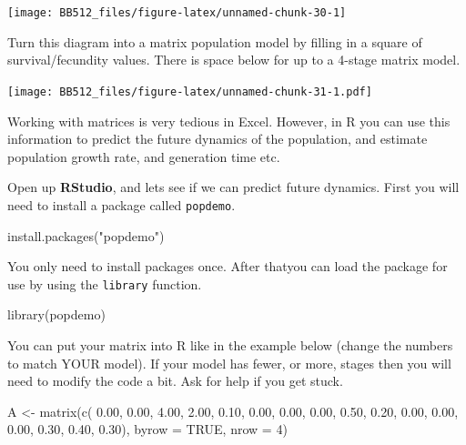 \documentclass[
  a4paper]{book}
\newenvironment{Shaded}{\begin{snugshade}}{\end{snugshade}}
\newcommand{\AttributeTok}[1]{\textcolor[rgb]{0.77,0.63,0.00}{#1}}
\newcommand{\ConstantTok}[1]{\textcolor[rgb]{0.00,0.00,0.00}{#1}}
\newcommand{\DecValTok}[1]{\textcolor[rgb]{0.00,0.00,0.81}{#1}}
\newcommand{\FloatTok}[1]{\textcolor[rgb]{0.00,0.00,0.81}{#1}}
\newcommand{\FunctionTok}[1]{\textcolor[rgb]{0.00,0.00,0.00}{#1}}
\newcommand{\NormalTok}[1]{#1}
\newcommand{\OtherTok}[1]{\textcolor[rgb]{0.56,0.35,0.01}{#1}}
\newcommand{\StringTok}[1]{\textcolor[rgb]{0.31,0.60,0.02}{#1}}
\begin{document}
\texttt{[image: BB512\_files/figure-latex/unnamed-chunk-30-1]}

Turn this diagram into a matrix population model by filling in a square
of survival/fecundity values. There is space below for up to a 4-stage
matrix model.

\texttt{[image: BB512\_files/figure-latex/unnamed-chunk-31-1.pdf]}

Working with matrices is very tedious in Excel. However, in R you can
use this information to predict the future dynamics of the population,
and estimate population growth rate, and generation time etc.

Open up \textbf{RStudio}, and lets see if we can predict future
dynamics. First you will need to install a package called
\texttt{popdemo}.

\begin{Shaded}
\begin{Highlighting}[]
\FunctionTok{install.packages}\NormalTok{(}\StringTok{"popdemo"}\NormalTok{)}
\end{Highlighting}
\end{Shaded}

You only need to install packages once. After thatyou can load the
package for use by using the \texttt{library} function.

\begin{Shaded}
\begin{Highlighting}[]
\FunctionTok{library}\NormalTok{(popdemo)}
\end{Highlighting}
\end{Shaded}

You can put your matrix into R like in the example below (change the
numbers to match YOUR model). If your model has fewer, or more, stages
then you will need to modify the code a bit. Ask for help if you get
stuck.

\begin{Shaded}
\begin{Highlighting}[]
\NormalTok{    A }\OtherTok{\textless{}{-}} \FunctionTok{matrix}\NormalTok{(}\FunctionTok{c}\NormalTok{( }\FloatTok{0.00}\NormalTok{, }\FloatTok{0.00}\NormalTok{, }\FloatTok{4.00}\NormalTok{, }\FloatTok{2.00}\NormalTok{,}
                   \FloatTok{0.10}\NormalTok{, }\FloatTok{0.00}\NormalTok{, }\FloatTok{0.00}\NormalTok{, }\FloatTok{0.00}\NormalTok{,}
                   \FloatTok{0.50}\NormalTok{, }\FloatTok{0.20}\NormalTok{, }\FloatTok{0.00}\NormalTok{, }\FloatTok{0.00}\NormalTok{,}
                   \FloatTok{0.00}\NormalTok{, }\FloatTok{0.30}\NormalTok{, }\FloatTok{0.40}\NormalTok{, }\FloatTok{0.30}\NormalTok{),}
                \AttributeTok{byrow =} \ConstantTok{TRUE}\NormalTok{, }\AttributeTok{nrow =} \DecValTok{4}\NormalTok{)}
\end{Highlighting}
\end{Shaded}
\end{document}
